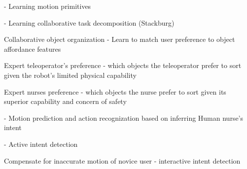 \documentclass[letterpaper, 11 pt, onecolumn]{article}
\begin{document}
- Learning motion primitives

- Learning collaborative task decomposition (Stackburg)

Collaborative object organization - Learn to match user preference to object affordance features

Expert teleoperator's preference - which objects the teleoperator prefer to sort given the robot's limited physical capability

Expert nurses preference - which objects the nurse prefer to sort given its superior capability and concern of safety

- Motion prediction and action recognization based on inferring Human nurse's intent

- Active intent detection

Compensate for inaccurate motion of novice user - interactive intent detection











\end{document}
